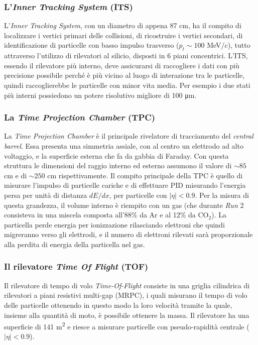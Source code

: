 \subsubsection{L'\textit{Inner Tracking System} (ITS)}
L'\emph{Inner Tracking System}, con un diametro di appena 87 cm, ha il compito di localizzare i vertici primari delle collisioni, di ricostruire i vertici secondari, di identificazione di particelle con basso impulso trasverso ($p_t \sim 100$ MeV/$c$), tutto attraverso l'utilizzo di rilevatori al silicio, disposti in 6 piani concentrici.
L'ITS, essendo il rilevatore più interno, deve assicurarsi di raccogliere i dati con più precisione possibile perché è più vicino al luogo di interazione tra le particelle, quindi raccoglierebbe le particelle con minor vita media.
Per esempio i due stati più interni possiedono un potere risolutivo migliore di 100 \si{\micro\metre}.

\subsubsection{La \textit{Time Projection Chamber} (TPC)}
La \emph{Time Projection Chamber} è il principale rivelatore di tracciamento del \textit{central barrel}.
Essa presenta una simmetria assiale, con al centro un elettrodo ad alto voltaggio, e la superficie esterna che fa da gabbia di Faraday.
Con questa struttura le dimensioni del raggio interno ed esterno assumono il valore di $\sim 85$ cm e di $\sim 250$ cm rispettivamente.
Il compito principale della TPC è quello di misurare l'impulso di particelle cariche e di effettuare PID misurando l'energia persa per unità di distanza $dE/dx$, per particelle con $|\eta| < 0.9$.
Per la misura di questa grandezza, il volume interno è riempito con un gas (che durante \textit{Run} 2 consisteva in una miscela composta all'88\% da Ar e al 12\% da CO$_2$).
La particella perde energia per ionizzazione rilasciando  elettroni che quindi migreranno verso gli elettrodi, e il numero di elettroni rilevati sarà proporzionale alla perdita di energia della particella nel gas.

\subsubsection{Il rilevatore \textit{Time Of Flight} (TOF)}
Il rilevatore di tempo di volo \emph{Time-Of-Flight} consiste in una griglia cilindrica di rilevatori a piani resistivi multi-gap (MRPC), i quali misurano il tempo di volo delle particelle ottenendo in questo modo la loro velocità tramite la quale, insieme alla quantità di moto, è possibile ottenere la massa.
Il rilevatore ha una superficie di 141 \si{m^2} e riesce a misurare particelle con pseudo-rapidità centrale ($|\eta| < 0.9$).

